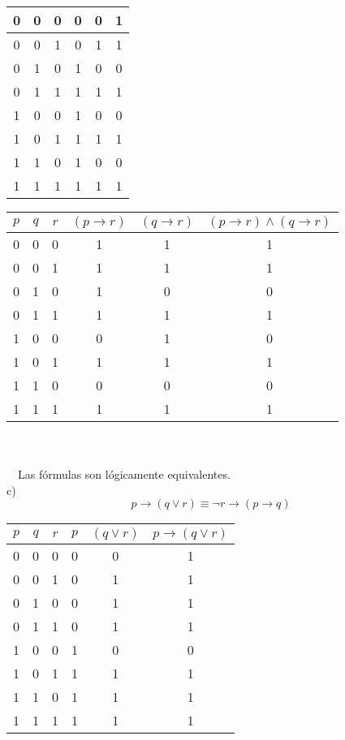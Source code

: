 \documentclass[11pt]{utalcaDoc}
\begin{document}
\begin{enumerate}
\begin{tabular}{|c|c|c||c|c|c|}
\hline 
0 & 0 & 0 & 0 & 0 & 1 \\ 
\hline 
0 & 0 & 1 & 0 & 1 & 1 \\ 
\hline 
0 & 1 & 0 & 1 & 0 & 0 \\ 
\hline 
0 & 1 & 1 & 1 & 1 & 1 \\ 
\hline 
1 & 0 & 0 & 1 & 0 & 0 \\ 
\hline
1 & 0 & 1 & 1 & 1 & 1 \\ 
\hline 
1 & 1 & 0 & 1 & 0 & 0 \\ 
\hline 
1 & 1 & 1 & 1 & 1 & 1 \\ 
\hline 
\end{tabular} 
\begin{tabular}{|c|c|c||c|c|c|}
\hline 
$p$ & $q$ & $r$ & $(p \to r)$ & $(q \to r)$ & $(p \to r) \wedge (q \to r)$ \\ 
\hline 
0 & 0 & 0 & 1 & 1 & 1 \\ 
\hline 
0 & 0 & 1 & 1 & 1 & 1 \\ 
\hline 
0 & 1 & 0 & 1 & 0 & 0 \\ 
\hline 
0 & 1 & 1 & 1 & 1 & 1 \\ 
\hline
1 & 0 & 0 & 0 & 1 & 0 \\ 
\hline 
1 & 0 & 1 & 1 & 1 & 1 \\ 
\hline 
1 & 1 & 0 & 0 & 0 & 0 \\ 
\hline 
1 & 1 & 1 & 1 & 1 & 1 \\ 
\hline 
\end{tabular} 
\\ \\ \ \
Las fórmulas son lógicamente equivalentes.
\[ \]
c)
\[ p \to (q \lor r) \equiv \neg r \to (p \to q) \]
\begin{tabular}{|c|c|c||c|c|c|}
\hline 
$p$ & $q$ & $r$ & $p$ & $(q \lor r)$ & $p \to (q \lor r)$ \\ 
\hline 
0 & 0 & 0 & 0 & 0 & 1 \\ 
\hline 
0 & 0 & 1 & 0 & 1 & 1 \\ 
\hline 
0 & 1 & 0 & 0 & 1 & 1 \\ 
\hline 
0 & 1 & 1 & 0 & 1 & 1 \\ 
\hline 
1 & 0 & 0 & 1 & 0 & 0 \\ 
\hline 
1 & 0 & 1 & 1 & 1 & 1 \\ 
\hline 
1 & 1 & 0 & 1 & 1 & 1 \\ 
\hline
1 & 1 & 1 & 1 & 1 & 1 \\ 
\hline 
\end{tabular} 

\end{enumerate}
\end{document}
